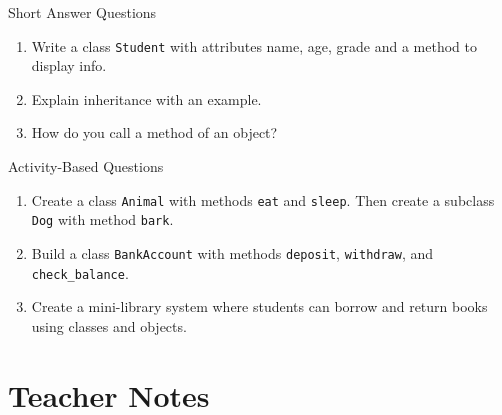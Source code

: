 \begin{exercise}{Short Answer Questions}
\begin{enumerate}
    \item Write a class \texttt{Student} with attributes name, age, grade and a method to display info.  
    \item Explain inheritance with an example.  
    \item How do you call a method of an object?  
\end{enumerate}
\end{exercise}

\begin{exercise}{Activity-Based Questions}
\begin{enumerate}
    \item Create a class \texttt{Animal} with methods \texttt{eat} and \texttt{sleep}. Then create a subclass \texttt{Dog} with method \texttt{bark}.  
    \item Build a class \texttt{BankAccount} with methods \texttt{deposit}, \texttt{withdraw}, and \texttt{check\_balance}.  
    \item Create a mini-library system where students can borrow and return books using classes and objects.  
\end{enumerate}
\end{exercise}

\section{Teacher Notes}


